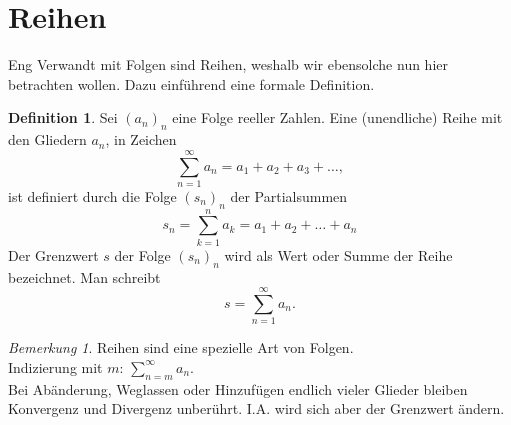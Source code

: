 \documentclass[fontsize=12pt,paper=a4,twoside,bibtotoc,idxtotoc,
liststotoc,pagesize,BCOR1.2cm,DIV15,chapterprefix,pagesize=pdftex]{scrbook}
\theoremstyle{plain}
\theoremstyle{definition}
\newtheorem{df}[equation]{Definition}
\theoremstyle{remark}
\newtheorem{bem}[equation]{Bemerkung}
\begin{document}
\section{Reihen}
Eng Verwandt mit Folgen sind Reihen, weshalb wir ebensolche nun hier betrachten wollen. Dazu einführend eine formale Definition.
\begin{df}
Sei $(a_n)_n$ eine Folge reeller Zahlen. Eine (unendliche)
Reihe mit den Gliedern $a_n$, in Zeichen
\[ \sum_{n=1}^\infty a_n =a_1 + a_2 + a_3 + \dots, \]
ist definiert durch die Folge $(s_n)_n$ der Partialsummen
\[
s_n=\sum_{k=1}^n a_k = a_1+a_2+ \dots +a_n 
\]
Der Grenzwert $s$ der Folge $(s_n)_n$ wird als Wert oder 
Summe der Reihe bezeichnet. Man schreibt
\[s= \sum_{n=1}^\infty a_n.\] 
\end{df}
\begin{bem}
Reihen sind eine spezielle Art von Folgen.\\
Indizierung mit $m$: $\sum_{n=m}^\infty a_n$.\\
Bei Abänderung, Weglassen oder Hinzufügen endlich vieler Glieder
bleiben Konvergenz und Divergenz unberührt. I.A. wird sich aber der
Grenzwert ändern.
\end{bem}
\end{document}
